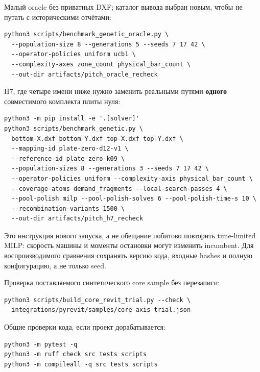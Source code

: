 \documentclass[11pt,a4paper]{article}
\begin{document}
Малый oracle без приватных DXF; каталог вывода выбран новым, чтобы не путать с историческими отчётами:


\begin{Verbatim}[fontsize=\scriptsize,frame=single,rulecolor=\color{gray!30},framesep=8pt]
python3 scripts/benchmark_genetic_oracle.py \
  --population-size 8 --generations 5 --seeds 7 17 42 \
  --operator-policies uniform ucb1 \
  --complexity-axes zone_count physical_bar_count \
  --out-dir artifacts/pitch_oracle_recheck
\end{Verbatim}

H7, где четыре имени ниже нужно заменить реальными путями \textbf{одного} совместимого комплекта плиты нуля:


\begin{Verbatim}[fontsize=\scriptsize,frame=single,rulecolor=\color{gray!30},framesep=8pt]
python3 -m pip install -e '.[solver]'
python3 scripts/benchmark_genetic.py \
  bottom-X.dxf bottom-Y.dxf top-X.dxf top-Y.dxf \
  --mapping-id plate-zero-d12-v1 \
  --reference-id plate-zero-k09 \
  --population-sizes 8 --generations 3 --seeds 7 17 42 \
  --operator-policies uniform --complexity-axis physical_bar_count \
  --coverage-atoms demand_fragments --local-search-passes 4 \
  --pool-polish milp --pool-polish-solves 6 --pool-polish-time-s 10 \
  --recombination-variants 1500 \
  --out-dir artifacts/pitch_h7_recheck
\end{Verbatim}

Это инструкция нового запуска, а не обещание побитово повторить time-limited MILP: скорость машины и моменты остановки могут изменить incumbent. Для воспроизводимого сравнения сохранять версию кода, входные hashes и полную конфигурацию, а не только seed.


Проверка поставляемого синтетического core sample без перезаписи:


\begin{Verbatim}[fontsize=\scriptsize,frame=single,rulecolor=\color{gray!30},framesep=8pt]
python3 scripts/build_core_revit_trial.py --check \
  integrations/pyrevit/samples/core-axis-trial.json
\end{Verbatim}

Общие проверки кода, если проект дорабатывается:


\begin{Verbatim}[fontsize=\scriptsize,frame=single,rulecolor=\color{gray!30},framesep=8pt]
python3 -m pytest -q
python3 -m ruff check src tests scripts
python3 -m compileall -q src tests scripts
\end{Verbatim}
\end{document}
